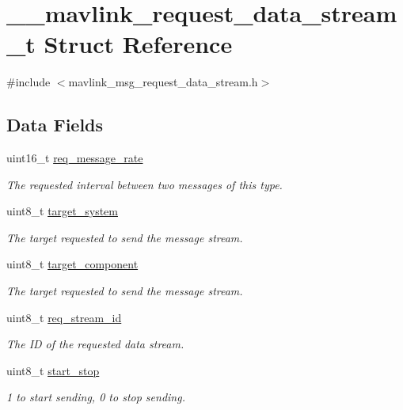 \hypertarget{struct____mavlink__request__data__stream__t}{\section{\+\_\+\+\_\+mavlink\+\_\+request\+\_\+data\+\_\+stream\+\_\+t Struct Reference}
\label{struct____mavlink__request__data__stream__t}
}


{\ttfamily \#include $<$mavlink\+\_\+msg\+\_\+request\+\_\+data\+\_\+stream.\+h$>$}

\subsection*{Data Fields}
\begin{DoxyCompactItemize}
\item 
uint16\+\_\+t \hyperlink{struct____mavlink__request__data__stream__t_a7be3844fa9c61b28b51dbd1fc452c1f0}{req\+\_\+message\+\_\+rate}
\begin{DoxyCompactList}\small\item\em The requested interval between two messages of this type. \end{DoxyCompactList}\item 
uint8\+\_\+t \hyperlink{struct____mavlink__request__data__stream__t_ad18b3be12f7ec2056677acd15c286d0a}{target\+\_\+system}
\begin{DoxyCompactList}\small\item\em The target requested to send the message stream. \end{DoxyCompactList}\item 
uint8\+\_\+t \hyperlink{struct____mavlink__request__data__stream__t_aab4483f29d41d2e72070bd4295e1395f}{target\+\_\+component}
\begin{DoxyCompactList}\small\item\em The target requested to send the message stream. \end{DoxyCompactList}\item 
uint8\+\_\+t \hyperlink{struct____mavlink__request__data__stream__t_af2333e886475f59842af3fd6ac61c08b}{req\+\_\+stream\+\_\+id}
\begin{DoxyCompactList}\small\item\em The I\+D of the requested data stream. \end{DoxyCompactList}\item 
uint8\+\_\+t \hyperlink{struct____mavlink__request__data__stream__t_aca2ea67e9e22299721f98ea586d78f07}{start\+\_\+stop}
\begin{DoxyCompactList}\small\item\em 1 to start sending, 0 to stop sending. \end{DoxyCompactList}\end{DoxyCompactItemize}



